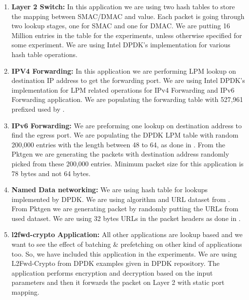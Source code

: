 \begin{enumerate}
 \item \textbf{Layer 2 Switch:} In this application we are using two hash tables to store the mapping between SMAC/DMAC and value. Each packet is going through two lookup stages, one for SMAC and one for DMAC. We are putting 16 Million entries in the table for the experiments, unless otherwise specified for some experiment. We are using Intel DPDK's implementation for various hash table operations.
\item \textbf{IPV4 Forwarding:} In this application we are performing LPM lookup on destination IP address to get the forwarding port. We are using Intel DPDK's implementation for LPM related operations for IPv4 Forwarding and IPv6 Forwarding application. We are populating the forwarding table with 527,961 prefixed used by \cite{189006}. 
\item \textbf{IPv6 Forwarding:} We are preforming one lookup on destination address to find the egress port. We are populating the DPDK LPM table with random 200,000 entries with the length between 48 to 64, as done in \cite{189006}. From the Pktgen we are generating the packets with destination address randomly picked from these 200,000 entries. Minimum packet size for this application is 78 bytes and not 64 bytes.
\item \textbf{Named Data networking:} We are using hash table for lookups implemented by DPDK. We are using algorithm and URL dataset from \cite{DBLP:conf/globecom/ZhangWYLL13}. From Pktgen we are generating packet by randomly putting the URLs from used dataset. We are using 32 bytes URLs in the packet headers as done in \cite{189006}.
\item \textbf{l2fwd-crypto Application:} All other applications are lookup based and we want to see the effect of batching \& prefetching on other kind of applications too. So, we have included this application in the experiments. We are using L2Fwd-Crypto\cite{l2crypto} from DPDK examples given in DPDK repository. The application performs encryption and decryption based on the input parameters and then it forwards the packet on Layer 2 with static port mapping. 
\end{enumerate}

